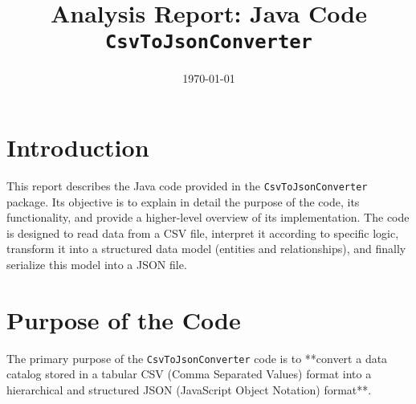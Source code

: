 \documentclass[11pt, a4paper]{article}
\title{Analysis Report: Java Code \texttt{CsvToJsonConverter}}
\date{\today}
\begin{document}
\maketitle
\thispagestyle{empty} %

\newpage
\tableofcontents %
\thispagestyle{empty} %

\newpage
\setcounter{page}{1} %

\section{Introduction}
This report describes the Java code provided in the \texttt{CsvToJsonConverter} package. Its objective is to explain in detail the purpose of the code, its functionality, and provide a higher-level overview of its implementation. The code is designed to read data from a CSV file, interpret it according to specific logic, transform it into a structured data model (entities and relationships), and finally serialize this model into a JSON file.

\section{Purpose of the Code}
The primary purpose of the \texttt{CsvToJsonConverter} code is to **convert a data catalog stored in a tabular CSV (Comma Separated Values) format into a hierarchical and structured JSON (JavaScript Object Notation) format**.
\end{document}
